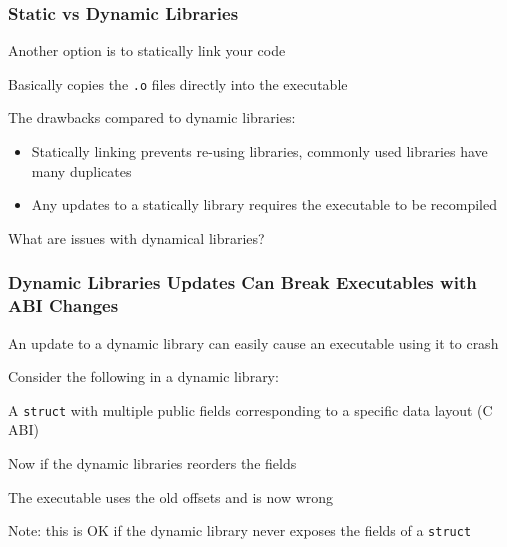 \documentclass[aspectratio=169]{beamer}
\begin{document}
  \begin{frame}
    \frametitle{Static vs Dynamic Libraries}

    Another option is to statically link your code

    \hspace{1em} Basically copies the \texttt{.o} files directly into the
    executable

    \vspace{2em}

    The drawbacks compared to dynamic libraries:
    \begin{itemize}
      \item Statically linking prevents re-using libraries, commonly used
            libraries have many duplicates
      \item Any updates to a statically library requires the executable to be
            recompiled
    \end{itemize}

    \vspace{2em}

    What are issues with dynamical libraries?
  \end{frame}

  \begin{frame}
    \frametitle{Dynamic Libraries Updates Can Break Executables with ABI
                Changes}

    An update to a dynamic library can easily cause an executable using it to
    crash

    \vspace{1em}

    Consider the following in a dynamic library:

    \hspace{1em} A \texttt{struct} with multiple public fields corresponding to
    a specific data layout (C ABI)

    \vspace{1em}


    \vspace{1em}

    Now if the dynamic libraries reorders the fields

    \hspace{1em} The executable uses the old offsets and is now wrong

    \vspace{1em}

    Note: this is OK if the dynamic library never exposes the fields of a
    \texttt{struct}
  \end{frame}
\end{document}
